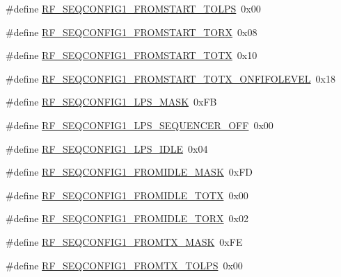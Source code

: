 \begin{DoxyCompactItemize}
\item 
\#define \hyperlink{sx1276Regs-Fsk_8h_a180dc23f59acdec302255e7fe8fdd7b5}{R\+F\+\_\+\+S\+E\+Q\+C\+O\+N\+F\+I\+G1\+\_\+\+F\+R\+O\+M\+S\+T\+A\+R\+T\+\_\+\+T\+O\+L\+PS}~0x00
\item 
\#define \hyperlink{sx1276Regs-Fsk_8h_a41fd3a8ddc9ada2815a3fab3da9f285f}{R\+F\+\_\+\+S\+E\+Q\+C\+O\+N\+F\+I\+G1\+\_\+\+F\+R\+O\+M\+S\+T\+A\+R\+T\+\_\+\+T\+O\+RX}~0x08
\item 
\#define \hyperlink{sx1276Regs-Fsk_8h_aa2d23a14e3b777e4facefba5816e2d77}{R\+F\+\_\+\+S\+E\+Q\+C\+O\+N\+F\+I\+G1\+\_\+\+F\+R\+O\+M\+S\+T\+A\+R\+T\+\_\+\+T\+O\+TX}~0x10
\item 
\#define \hyperlink{sx1276Regs-Fsk_8h_aa02ee770e23b0c4a96bcc52f0766f36a}{R\+F\+\_\+\+S\+E\+Q\+C\+O\+N\+F\+I\+G1\+\_\+\+F\+R\+O\+M\+S\+T\+A\+R\+T\+\_\+\+T\+O\+T\+X\+\_\+\+O\+N\+F\+I\+F\+O\+L\+E\+V\+EL}~0x18
\item 
\#define \hyperlink{sx1276Regs-Fsk_8h_a02ee763d7a7708377930505f75a3186c}{R\+F\+\_\+\+S\+E\+Q\+C\+O\+N\+F\+I\+G1\+\_\+\+L\+P\+S\+\_\+\+M\+A\+SK}~0x\+FB
\item 
\#define \hyperlink{sx1276Regs-Fsk_8h_aec8c7e8c3338f262ec4d0f345846a386}{R\+F\+\_\+\+S\+E\+Q\+C\+O\+N\+F\+I\+G1\+\_\+\+L\+P\+S\+\_\+\+S\+E\+Q\+U\+E\+N\+C\+E\+R\+\_\+\+O\+FF}~0x00
\item 
\#define \hyperlink{sx1276Regs-Fsk_8h_a1b623685f94da423e0c38564e9ca3db0}{R\+F\+\_\+\+S\+E\+Q\+C\+O\+N\+F\+I\+G1\+\_\+\+L\+P\+S\+\_\+\+I\+D\+LE}~0x04
\item 
\#define \hyperlink{sx1276Regs-Fsk_8h_ab1e6c8bba2d45e7fc1f08440f818d0d7}{R\+F\+\_\+\+S\+E\+Q\+C\+O\+N\+F\+I\+G1\+\_\+\+F\+R\+O\+M\+I\+D\+L\+E\+\_\+\+M\+A\+SK}~0x\+FD
\item 
\#define \hyperlink{sx1276Regs-Fsk_8h_a0f54c10177f68ae9802ae741bbdc9493}{R\+F\+\_\+\+S\+E\+Q\+C\+O\+N\+F\+I\+G1\+\_\+\+F\+R\+O\+M\+I\+D\+L\+E\+\_\+\+T\+O\+TX}~0x00
\item 
\#define \hyperlink{sx1276Regs-Fsk_8h_a327106f766ae675b2410b0a8c90d8627}{R\+F\+\_\+\+S\+E\+Q\+C\+O\+N\+F\+I\+G1\+\_\+\+F\+R\+O\+M\+I\+D\+L\+E\+\_\+\+T\+O\+RX}~0x02
\item 
\#define \hyperlink{sx1276Regs-Fsk_8h_a8d9a8b1cebb2d1f6da7eb71779c62562}{R\+F\+\_\+\+S\+E\+Q\+C\+O\+N\+F\+I\+G1\+\_\+\+F\+R\+O\+M\+T\+X\+\_\+\+M\+A\+SK}~0x\+FE
\item 
\#define \hyperlink{sx1276Regs-Fsk_8h_a55d5e49e5d8ebda93a64135e6f0cd9d7}{R\+F\+\_\+\+S\+E\+Q\+C\+O\+N\+F\+I\+G1\+\_\+\+F\+R\+O\+M\+T\+X\+\_\+\+T\+O\+L\+PS}~0x00
\item 

\end{DoxyCompactItemize}

